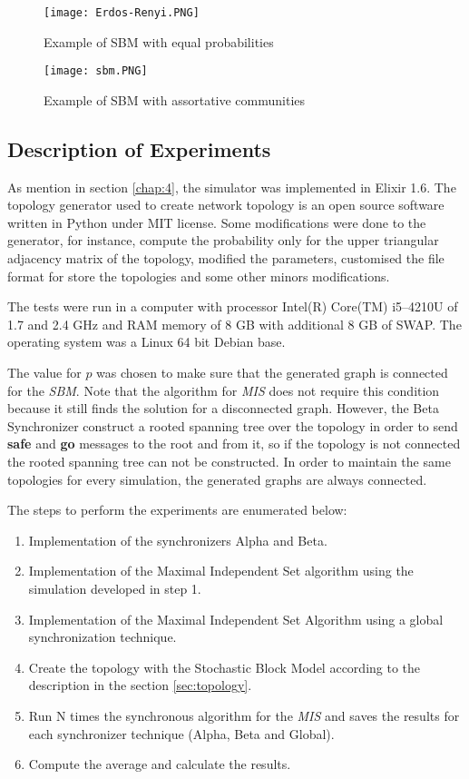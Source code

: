 \begin{figure}[ht]
\centering
\texttt{[image: Erdos-Renyi.PNG]} 
\caption{Example of SBM with equal probabilities}
\label{fig:erdos}
\end{figure}

\begin{figure}[ht]
\centering
\texttt{[image: sbm.PNG]} 
\caption{Example of SBM with assortative communities}
\label{fig:sbm}
\end{figure}

\subsection{Description of Experiments}

As mention in section \ref{chap:4}, the simulator was implemented in Elixir 1.6. The topology generator used to create network topology is an open source software written in Python under MIT license. Some modifications were done to the generator, for instance, compute the probability only for the upper triangular adjacency matrix of the topology, modified the parameters, customised the file format for store the topologies and some other minors modifications. 

The tests were run in a computer with processor Intel(R) Core(TM) i5--4210U of 1.7 and 2.4 GHz and RAM memory of 8 GB with additional 8 GB of SWAP. The operating system was a Linux 64 bit Debian base.


The value for $p$ was chosen to make sure that the generated graph is connected for the \textit{SBM}. Note that the algorithm for \textit{MIS} does not require this condition because it still finds the solution for a disconnected graph. However, the Beta Synchronizer construct a rooted spanning tree over the topology in order to send \textbf{safe} and \textbf{go} messages to the root and from it, so if the topology is not connected the rooted spanning tree can not be constructed. In order to maintain the same topologies for every simulation, the generated graphs are always connected.  

The steps to perform the experiments are enumerated below:

\begin{enumerate}
\item Implementation of the synchronizers Alpha and Beta.
\item Implementation of the Maximal Independent Set algorithm using the simulation developed in step 1.
\item Implementation of the Maximal Independent Set Algorithm using a global synchronization technique.
\item Create the topology with the Stochastic Block Model according to the description in the section \ref{sec:topology}.
\item Run N times the synchronous algorithm for the \textit{MIS} and saves the results for each synchronizer technique (Alpha, Beta and Global).
\item Compute the average and calculate the results.
\end{enumerate}



